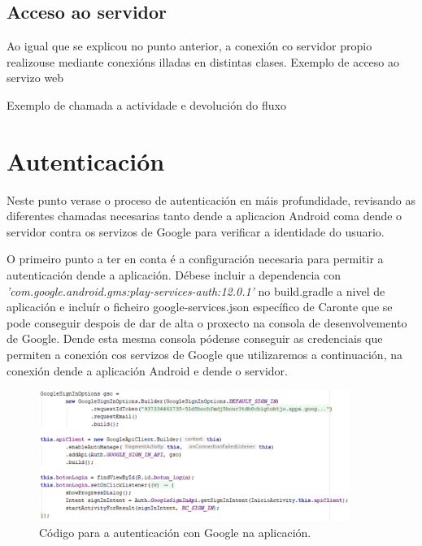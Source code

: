 \subsection{Acceso ao servidor}
Ao igual que se explicou no punto anterior, a conexión co servidor propio realizouse mediante conexións illadas en distintas clases. 
Exemplo de acceso ao servizo web




Exemplo de chamada a actividade e devolución do fluxo






\section{Autenticación}
Neste punto verase o proceso de autenticación en máis profundidade, revisando as diferentes chamadas necesarias tanto dende a aplicacion Android coma dende o servidor contra os servizos de Google para verificar a identidade do usuario.

O primeiro punto a ter en conta é a configuración necesaria para permitir a autenticación dende a aplicación. Débese incluir a dependencia con \emph{'com.google.android.gms:play-services-auth:12.0.1'} no build.gradle a nivel de aplicación e incluír o ficheiro google-services.json específico de Caronte que se pode conseguir despois de dar de alta o proxecto na consola de desenvolvemento de Google. Dende esta mesma consola pódense conseguir as credenciais que permiten a conexión cos servizos de Google que utilizaremos a continuación, na conexión dende a aplicación Android e dende o servidor.





\begin{figure}[htb] 
	\begin{center}
		\includegraphics[width=0.9\textwidth]{figures/codigo/autenticacionGoogleInicio}
		\caption{Código para a autenticación con Google na aplicación.}
		\label{fig:autenticacionGoogleInicio}
	\end{center}
\end{figure}

